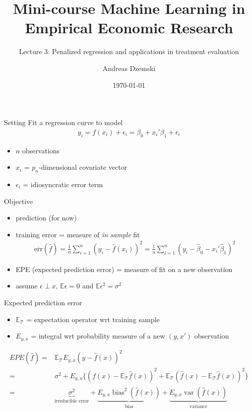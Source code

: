 \documentclass[xcolor=dvipsnames]{beamer}
\author[Dzemski]{Andreas Dzemski\inst{1}}
\institute{\inst{1} University of Gothenburg}
\title{Mini-course Machine Learning in Empirical Economic Research}
\subtitle{Lecture 3: Penalized regression and applications in treatment evaluation}
\date{\today}
\newcommand{\E}{\mathbb{E}}
\DeclareMathOperator{\bias}{bias}
\DeclareMathOperator{\var}{var}
\begin{document}
\maketitle

\begin{frame}{Setting}
Fit a regression curve to model
\begin{align*}
  y_i = f(x_i) + \epsilon_i = \beta_0 + x_i'\beta_1 + \epsilon_i
\end{align*}
\begin{itemize}
  \item $n$ observations
  \item $x_i$ = $p_n$-dimensional covariate vector
  \item $\epsilon_i$ = idiosyncratic error term
\end{itemize}
\end{frame}

\begin{frame}{Objective}
\begin{itemize}
  \item prediction (for now)
  \item training error = measure of \emph{in sample} fit
  \begin{align*}
  \overline{\text{err}} (\hat{f}) 
  = 
    \frac{1}{n} \sum_{i=1}^n \left(y_i - \hat{f}(x_i)\right)^2 
    = 
    \frac{1}{n} \sum_{i=1}^n \left(y_i - \hat{\beta}_0 - x_i'\hat{\beta}_1 \right)^2  
  \end{align*}
  \item EPE (expected prediction error) = measure of fit on a new observation
  \item assume $\epsilon \perp x$, $\E \epsilon = 0$ and $\E \epsilon^2 = \sigma^2$
\end{itemize}
\end{frame}


\begin{frame}{Expected prediction error}
\begin{itemize}
  \item $\E_{\mathcal{T}}$ = expectation operator wrt training sample
  \item $E_{y,x}$ = integral wrt probability measure of a new $(y, x')$ observation  
\end{itemize}
\begin{align*}
  EPE (\hat{f}) =& \E_{\mathcal{T}} E_{y,x} \left(y - \hat{f} (x) \right)^2
  \\
  =& \sigma^2 + E_{y,x} 
  \Big\{ 
    \left(f(x) - \E_{\mathcal{T}}\hat{f}(x)\right)^2 
    + \E_{\mathcal{T}} \left(\hat{f}(x) - \E_{\mathcal{T}} \hat{f}(x)\right)^2 
  \Big\}
\\
  =& \underbrace{\sigma^2}_{\text{irreducible error}} + 
  \underbrace{E_{y,x} \bias^2\left(\hat{f}(x)\right)}_{\text{bias}} + 
  \underbrace{E_{y,x} \var\left(\hat{f}(x)\right)}_{\text{variance}}
\end{align*}
\end{frame}
\end{document}
